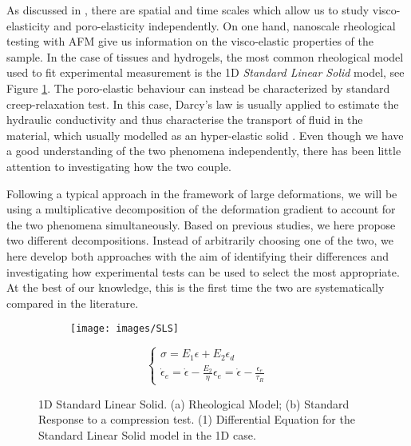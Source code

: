 As discussed in \cite{viscoporo}, there are spatial and time scales which allow us to study visco-elasticity and poro-elasticity independently. On one hand, nanoscale rheological testing with AFM give us information on the visco-elastic properties of the sample. In the case of tissues and hydrogels, the most common rheological model used to fit experimental measurement is the 1D \textit{Standard Linear Solid} model\cite{Article1,viscoporo}, see Figure \ref{SLS}. The poro-elastic behaviour can instead be characterized by standard creep-relaxation test. In this case, Darcy's law is usually applied to estimate the hydraulic conductivity and thus characterise the transport of fluid in the material, which usually modelled as an hyper-elastic solid \cite{Netti,viscoporo}. Even though we have a good understanding of the two phenomena independently, there has been little attention to investigating how the two couple. 

Following a typical approach in the framework of large deformations, we will be using a multiplicative decomposition of the deformation gradient to account for the two phenomena simultaneously. 
Based on previous studies, we here propose two different decompositions. Instead of arbitrarily choosing one of the two, we here develop both approaches with the aim of identifying their differences and investigating how experimental tests can be used to select the most appropriate. At the best of our knowledge, this is the first time the two are systematically compared in the literature.


\begin{figure}
	\begin{subfigure}{0.45\textwidth}
		\centering 
		\def\svgwidth{1.3\linewidth}
		
		\caption{}
	\end{subfigure}
	\begin{subfigure}{0.45\textwidth}
	\centering
	\texttt{[image: images/SLS]}\qquad 
	\caption{}
	\end{subfigure}

\vspace{5mm}
\begin{equation}
\begin{cases}
\sigma = E_1\epsilon+E_2\epsilon_d\\
\dot{\epsilon}_e = \dot{\epsilon} -\frac{E_2}{\eta} \epsilon_e = \dot{\epsilon} - \frac{\epsilon_e}{\tau_R}
\end{cases}
\end{equation}
\vspace{3mm}
\caption{1D Standard Linear Solid. (a) Rheological Model; (b) Standard Response to a compression test. (1) Differential Equation for the Standard Linear Solid model in the 1D case.}
\label{SLS}
\end{figure}

